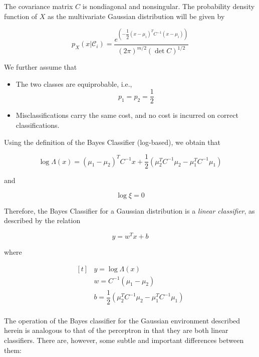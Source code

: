 \documentclass[twocolumn]{article}
\begin{document}
		 The covariance matrix $ C $ is nondiagonal and nonsingular. The probability density function of $ X $ as the multivariate Gaussian distribution will be given by

		 $$ p_{X} (x | \mathcal{C}_{i}) = \dfrac{ e^{\left( -\dfrac{1}{2} (x - \mu_{i})^{T}C^{-1} (x - \mu_{i})\right)}}{ (2\pi)^{m/2} (\det C)^{1/2}} $$

		 We further assume that

		 \begin{itemize}
			 \item The two classes are equiprobable, i.e.,
			       $$ p_{1} = p_{2} = \dfrac{1}{2} $$
			 \item Misclassifications carry the same cost, and no cost is incurred on correct classifications.
		 \end{itemize}

		 Using the definition of the Bayes Classifier (log-based), we obtain that

		 $$ \log \Lambda (x) = (\mu_{1} - \mu_{2})^{T} C^{-1} x + \dfrac{1}{2} (\mu_{2}^{T} C^{-1} \mu_{2} - \mu^{T}_{1} C^{-1}\mu_{1}) $$

		 \noindent and

		 $$ \log \xi = 0 $$

		 Therefore, the Bayes Classifier for a Gaussian distribution is a \textit{linear classifier}, as described by the relation

		 $$ y = w^{T}x + b $$

		 \noindent where

		 $$ \begin{aligned}[t]
				  & y = \log \Lambda (x)                                                      \\
				  & w = C^{-1} (\mu_{1} - \mu_{2})                                            \\
				  & b = \dfrac{1}{2} (\mu_{2}^{T} C^{-1} \mu_{2} - \mu_{1}^{T} C^{-1}\mu_{1}) \\
			 \end{aligned} $$

		 The operation of the Bayes classifier for the Gaussian environment described herein is analogous to that of the perceptron in that they are both linear classifiers. There are, however, some subtle and important differences between them:
\end{document}
